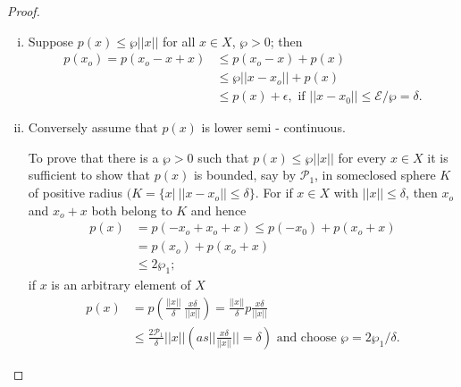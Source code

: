 \begin{proof}
 \begin{enumerate}[i)]
 \item Suppose $p(x) \leq \wp || x || $ for all $x \in X$, $\wp > 0$; then 
  \begin{align*}
   p(x_o) = p(x_o -x+ x) & \leq p(x_o - x) + p(x) \\
   & \leq \wp || x - x_o || + p(x)\\
   & \leq p(x) + \epsilon, \text{ if }|| x - x_0|| \leq \mathcal{E} / \wp =
   \delta.  
  \end{align*}
 \item Conversely assume that $p(x)$ is lower semi - continuous. 
  
  To prove that there is a $\wp > 0$ such that $p(x)\leq \wp || x
  ||$ for every $x \in X$ it is sufficient to show that $p(x)$ is
  bounded, say by $\mathscr{P}_1$, in some\pageoriginale closed sphere $K$ of positive
  radius $(K = \big\{ x|~ || x - x_o|| \leq \delta \big\}$. For if $x
  \in X$ with $||x || \leq \delta$, then $x_o$ and $x_o + x$ both
  belong to $K$ and hence 
  \begin{align*}
   p(x) & = p(-x_o + x_o +x) \leq p(-x_0) + p(x_o +x)\\ 
   & = p(x_o) + p(x_o + x)\\
   & \leq 2 \wp_1 ; 
  \end{align*}
  if $x$ is an arbitrary element of $X$ 
  \begin{align*}
   p (x) & = p\left( \frac{||x||}{\delta} ~\frac{x
    \delta}{||x||}\right) = \frac{||x||}{\delta} p 
   \frac{x\delta}{|| x||}\\ 
   & \leq \frac{2 \mathscr{P}_1}{\delta}||x|| \left(as ||\frac{x \delta}{||
    x ||} ||= \delta \right) \text{ and choose } \wp = 2 \wp_1 /
   \delta. 
  \end{align*}
 \end{enumerate}
 

\end{proof}

